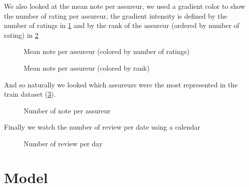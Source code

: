 \documentclass[a4paper, 12pt, one column]{article}
\begin{document}
\restoregeometry

We also looked at the mean note per assureur, we used a gradient color to show the number of rating per assureur, the gradient intensity is defined by the number of ratings in \cref{fig:mean_note_per_assureur} and by the rank of the assureur (ordered by number of rating) in \cref{fig:mean_note_per_assureur_linear}

\begin{figure}[H]
    \advance\leftskip-3cm
    
    \caption{Mean note per assureur (colored by number of ratings)}
    \label{fig:mean_note_per_assureur}
\end{figure}
\begin{figure}[H]
    \advance\leftskip-3cm
    
    \caption{Mean note per assureur (colored by rank)}
    \label{fig:mean_note_per_assureur_linear}
\end{figure}
\restoregeometry

And so naturally we looked which assureurs were the most represented in the train dataset (\cref{fig:nbnote_per_assureur}).

\begin{figure}[H]
    \advance\leftskip-2.5cm
    
    \caption{Number of note per assureur}
    \label{fig:nbnote_per_assureur}
\end{figure}

Finally we watch the number of review per date using a calendar

\begin{figure}[H]
    \advance\leftskip-3cm
    
    \caption{Number of review per day}
    \label{fig:count_calendar}
\end{figure}
\section{Model}
\end{document}
